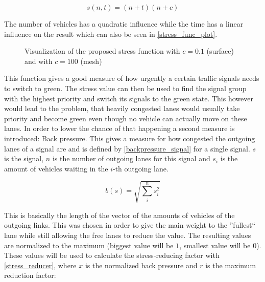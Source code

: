 \begin{equation} \label{proposed_stress}
	s(n, t) = (n + t)(n + c)
\end{equation}

The number of vehicles has a quadratic influence while the time has a linear influence on the result which can also be seen in \autoref{stress_func_plot}.

\begin{figure}[h!]
	\centering
	\label{stress_func_plot}
	\caption{Visualization of the proposed stress function with $c = 0.1$ (surface) and with $c = 100$ (mesh)}
\end{figure}

This function gives a good measure of how urgently a certain traffic signals needs to switch to green. The stress value can then be used to find the signal group with the highest priority and switch its signals to the green state. This however would lead to the problem, that heavily congested lanes would usually take priority and become green even though no vehicle can actually move on these lanes. In order to lower the chance of that happening a second measure is introduced: Back pressure. This gives a measure for how congested the outgoing lanes of a signal are and is defined by \autoref{backpressure_signal} for a single signal. $s$ is the signal, $n$ is the number of outgoing lanes for this signal and $s_i$ is the amount of vehicles waiting in the $i$-th outgoing lane.

\begin{equation} \label{backpressure_signal}
b(s) = \sqrt{\sum_{i}^{n}{s_{i}^2}}
\end{equation}

This is basically the length of the vector of the amounts of vehicles of the outgoing links. This was chosen in order to give the main weight to the ''fullest`` lane while still allowing the free lanes to reduce the value. The resulting values are normalized to the maximum (biggest value will be $1$, smallest value will be $0$). These values will be used to calculate the stress-reducing factor with \autoref{stress_reducer}, where $x$ is the normalized back pressure and $r$ is the maximum reduction factor:

